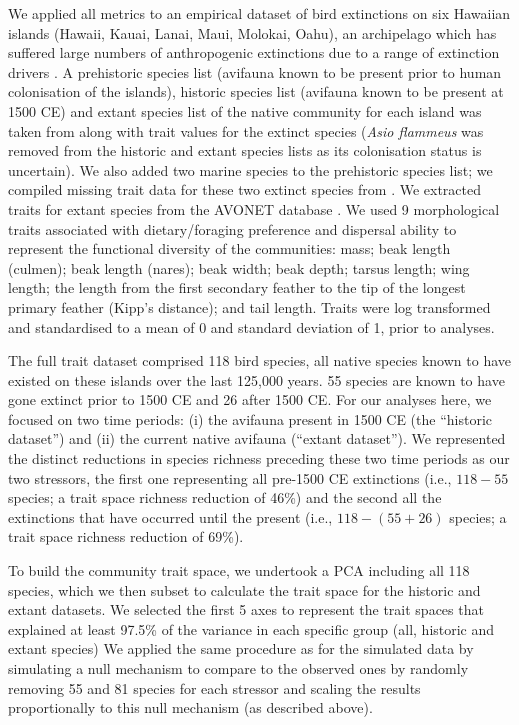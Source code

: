 \documentclass[12pt,letterpaper]{article}
\begin{document}
We applied all metrics to an empirical dataset of bird extinctions on six Hawaiian islands (Hawaii, Kauai, Lanai, Maui, Molokai, Oahu), an archipelago which has suffered large numbers of anthropogenic extinctions due to a range of extinction drivers \citep{Walther2022}.
A prehistoric species list (avifauna known to be present prior to human colonisation of the islands), historic species list (avifauna known to be present at 1500 CE) and extant species list of the native community for each island was taken from \cite{matthews2023global} along with trait values for the extinct species (\textit{Asio flammeus} was removed from the historic and extant species lists as its colonisation status is uncertain).
We also added two marine species to the prehistoric species list; we compiled missing trait data for these two extinct species from \cite{sayol2021loss}.
We extracted traits for extant species from the AVONET database \citep{tobias2022avonet}.
We used 9 morphological traits associated with dietary/foraging preference and dispersal ability \citep{pigot2020macroevolutionary,sheard2020ecological} to represent the functional diversity of the communities: mass; beak length (culmen); beak length (nares); beak width; beak depth; tarsus length; wing length; the length from the first secondary feather to the tip of the longest primary feather (Kipp's distance); and tail length.
Traits were log transformed and standardised to a mean of 0 and standard deviation of 1, prior to analyses.

The full trait dataset comprised 118 bird species, all native species known to have existed on these islands over the last 125,000 years.
55 species are known to have gone extinct prior to 1500 CE and 26 after 1500 CE.
For our analyses here, we focused on two time periods: (i) the avifauna present in 1500 CE (the ``historic dataset'') and (ii) the current native avifauna (``extant dataset'').
We represented the distinct reductions in species richness preceding these two time periods as our two stressors, the first one representing all pre-1500 CE extinctions (i.e., $118-55$ species; a trait space richness reduction of 46\%) and the second all the extinctions that have occurred until the present (i.e., $118-(55+26)$ species; a trait space richness reduction of 69\%).

To build the community trait space, we undertook a PCA including all 118 species, which we then subset to calculate the trait space for the historic and extant datasets.
We selected the first 5 axes to represent the trait spaces that explained at least 97.5\% of the variance in each specific group (all, historic and extant species)
We applied the same procedure as for the simulated data by simulating a null mechanism to compare to the observed ones by randomly removing 55 and 81 species for each stressor and scaling the results proportionally to this null mechanism (as described above).
\end{document}
